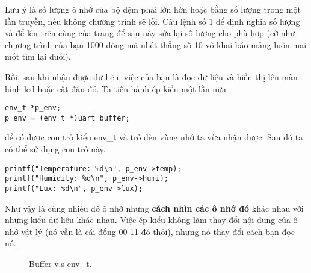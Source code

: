 Lưu ý là số lượng ô nhớ của bộ đệm phải lớn hớn hoặc bằng số lượng trong một lần truyền, nếu không chương trình sẽ lỗi. Câu lệnh số 1 để định nghĩa số lượng và để lên trên cùng của trang để sau này sửa lại số lượng cho phù hợp (cỡ như chương trình của bạn 1000 dòng mà nhét thẳng số 10 vô khai báo mảng luôn mai mốt tìm lại đuối).

Rồi, sau khi nhận được dữ liệu, việc của bạn là đọc dữ liệu và hiển thị lên màn hình lcd hoặc cất đâu đó. Ta tiến hành ép kiểu một lần nữa
\begin{lstlisting}
env_t *p_env;
p_env = (env_t *)uart_buffer;

\end{lstlisting}
để có được con trỏ kiểu env\_t và trỏ đến vùng nhớ ta vừa nhận được. Sau đó ta có thể sử dụng con trỏ này.
\begin{lstlisting}
printf("Temperature: %d\n", p_env->temp);
printf("Humidity: %d\n", p_env->humi);
printf("Lux: %d\n", p_env->lux);

\end{lstlisting}

Như vậy là cùng nhiêu đó ô nhớ nhưng \textbf{cách nhìn các ô nhớ đó} khác nhau với những kiểu dữ liệu khác nhau. Việc ép kiểu không làm thay đổi nội dung của ô nhớ vật lý (nó vẫn là cái đống 00 11 đó thôi), nhưng nó thay đổi cách bạn đọc nó.
\begin{figure}[h!]
\centering
{}
\caption{Buffer v.s env\_t.}
\end{figure}

